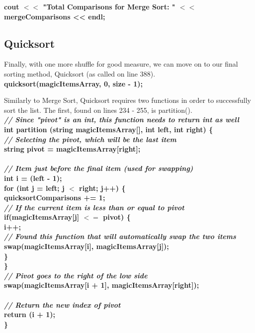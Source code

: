 \documentclass{article}
\begin{document}
\textbf{
\indent cout $<<$ "Total Comparisons for Merge Sort: " $<<$ mergeComparisons << endl;\\ }


\subsection{Quicksort}
Finally, with one more shuffle for good measure, we can move on to our final sorting method, Quicksort (as called on line 388).\\

\textbf{
\indent quicksort(magicItemsArray, 0, size - 1);\\ }

Similarly to Merge Sort, Quicksort requires two functions in order to successfully sort the list. The first, found on lines 234 - 255, is partition(). \\

\textbf{
\textit{// Since "pivot" is an int, this function needs to return int as well\\}
int partition (string magicItemsArray[], int left, int right) \{\\
    \textit{\indent // Selecting the pivot, which will be the last item\\}
    \indent string pivot = magicItemsArray[right];\\
\\
    \textit{\indent // Item just before the final item (used for swapping)\\}
    \indent int i = (left - 1);\\
    \indent for (int j = left; j $<$ right; j++) \{\\
        \indent \indent quicksortComparisons += 1;\\
       \textit{\indent \indent // If the current item is less than or equal to pivot\\}
        \indent \indent if(magicItemsArray[j] $<=$ pivot) \{\\
            \indent \indent \indent i++;\\
            \textit{\indent \indent \indent // Found this function that will automatically swap the two items\\}
            \indent \indent \indent swap(magicItemsArray[i], magicItemsArray[j]);\\
        \indent \indent \}\\
    \indent \}\\
    \textit{\indent // Pivot goes to the right of the low side\\}
    \indent swap(magicItemsArray[i + 1], magicItemsArray[right]);\\
\\
    \textit{\indent // Return the new index of pivot\\}
    \indent return (i + 1);\\
\}\\
}
\end{document}
